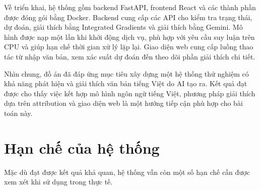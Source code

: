 Về triển khai, hệ thống gồm backend FastAPI, frontend React và các thành phần được đóng gói bằng Docker. Backend cung cấp các API cho kiểm tra trạng thái, dự đoán, giải thích bằng Integrated Gradients và giải thích bằng Gemini. Mô hình được nạp một lần khi khởi động dịch vụ, phù hợp với yêu cầu suy luận trên CPU và giúp hạn chế thời gian xử lý lặp lại. Giao diện web cung cấp luồng thao tác từ nhập văn bản, xem xác suất dự đoán đến theo dõi phần giải thích chi tiết.

Nhìn chung, đồ án đã đáp ứng mục tiêu xây dựng một hệ thống thử nghiệm có khả năng phát hiện và giải thích văn bản tiếng Việt do AI tạo ra. Kết quả đạt được cho thấy việc kết hợp mô hình ngôn ngữ tiếng Việt, phương pháp giải thích dựa trên attribution và giao diện web là một hướng tiếp cận phù hợp cho bài toán này.

\section{Hạn chế của hệ thống}

Mặc dù đạt được kết quả khả quan, hệ thống vẫn còn một số hạn chế cần được xem xét khi sử dụng trong thực tế.

